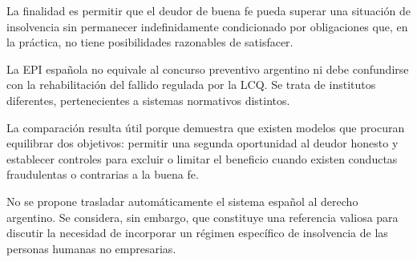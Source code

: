 \documentclass[12pt,oneside]{book}
\begin{document}
La finalidad es permitir que el deudor de buena fe pueda superar una situación de insolvencia sin permanecer indefinidamente condicionado por obligaciones que, en la práctica, no tiene posibilidades razonables de satisfacer.

\begin{note}
La EPI española no equivale al concurso preventivo argentino ni debe confundirse con la rehabilitación del fallido regulada por la LCQ. Se trata de institutos diferentes, pertenecientes a sistemas normativos distintos.
\end{note}

La comparación resulta útil porque demuestra que existen modelos que procuran equilibrar dos objetivos: permitir una segunda oportunidad al deudor honesto y establecer controles para excluir o limitar el beneficio cuando existen conductas fraudulentas o contrarias a la buena fe.

No se propone trasladar automáticamente el sistema español al derecho argentino. Se considera, sin embargo, que constituye una referencia valiosa para discutir la necesidad de incorporar un régimen específico de insolvencia de las personas humanas no empresarias.
\end{document}
